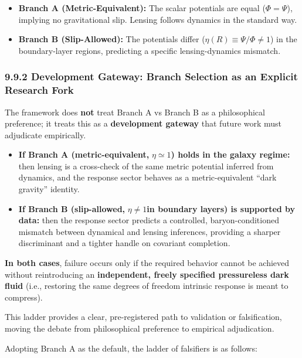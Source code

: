 \begin{itemize}
\item
  \textbf{Branch A (Metric-Equivalent):} The scalar potentials are equal (\(\Phi = \Psi\)), implying no gravitational slip. Lensing follows dynamics in the standard way.
\item
  \textbf{Branch B (Slip-Allowed):} The potentials differ (\(\eta(R) \equiv \Psi\text{/}\Phi \neq 1\)) in the boundary-layer regions, predicting a specific lensing-dynamics mismatch.
\end{itemize}

\subsubsection{9.9.2 Development Gateway: Branch Selection as an Explicit Research Fork}\label{development-gateway-branch-selection-as-an-explicit-research-fork}

The framework does \textbf{not} treat Branch A vs Branch B as a philosophical preference; it treats this as a \textbf{development gateway} that future work must adjudicate empirically.

\begin{itemize}
\item
  \textbf{If Branch A (metric-equivalent,} \(\eta \simeq 1\)\textbf{) holds in the galaxy regime:} then lensing is a cross-check of the same metric potential inferred from dynamics, and the response sector behaves as a metric-equivalent ``dark gravity'' identity.
\item
  \textbf{If Branch B (slip-allowed,} \(\eta \neq 1\)\textbf{in boundary layers) is supported by data:} then the response sector predicts a controlled, baryon-conditioned mismatch between dynamical and lensing inferences, providing a sharper discriminant and a tighter handle on covariant completion.
\end{itemize}

\textbf{In both cases}, failure occurs only if the required behavior cannot be achieved without reintroducing an \textbf{independent, freely specified pressureless dark fluid} (i.e., restoring the same degrees of freedom intrinsic response is meant to compress).

This ladder provides a clear, pre-registered path to validation or falsification, moving the debate from philosophical preference to empirical adjudication.

Adopting Branch A as the default, the ladder of falsifiers is as follows:

